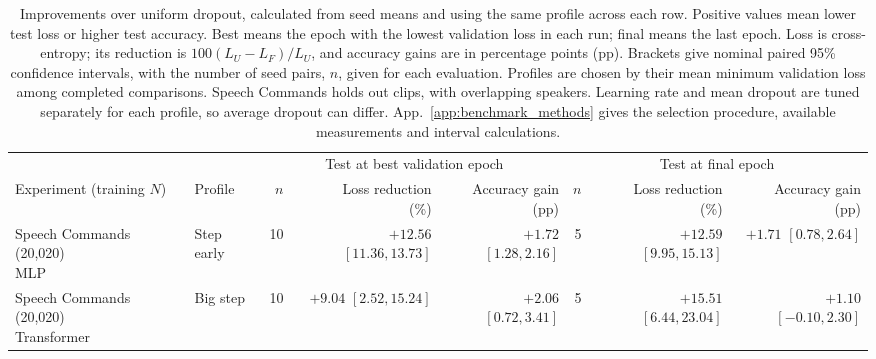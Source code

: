 \begin{table}[t]
\centering
\caption{Improvements over uniform dropout, calculated from seed means and using the same profile across each row. Positive values mean lower test loss or higher test accuracy. Best means the epoch with the lowest validation loss in each run; final means the last epoch. Loss is cross-entropy; its reduction is $100(L_U-L_F)/L_U$, and accuracy gains are in percentage points (pp). Brackets give nominal paired 95\% confidence intervals, with the number of seed pairs, $n$, given for each evaluation. Profiles are chosen by their mean minimum validation loss among completed comparisons. Speech Commands holds out clips, with overlapping speakers. Learning rate and mean dropout are tuned separately for each profile, so average dropout can differ. App.~\ref{app:benchmark_methods} gives the selection procedure, available measurements and interval calculations.}
\label{tab:frontloaded_results}
\footnotesize
\setlength{\tabcolsep}{4pt}
\renewcommand{\arraystretch}{1.15}
\begin{tabular}{@{}llrrrrrr@{}}
\toprule
& & \multicolumn{3}{c}{Test at best validation epoch} & \multicolumn{3}{c}{Test at final epoch} \\
\cmidrule(lr){3-5}\cmidrule(l){6-8}
Experiment (training $N$) & Profile & $n$ & \shortstack{Loss reduction\\(\%)} & \shortstack{Accuracy gain\\(pp)} & $n$ & \shortstack{Loss reduction\\(\%)} & \shortstack{Accuracy gain\\(pp)} \\
\midrule
\shortstack[l]{Speech Commands (20,020)\\MLP} & Step early & 10 & \shortstack{$+12.56$\\[-1pt]{\scriptsize $[11.36, 13.73]$}} & \shortstack{$+1.72$\\[-1pt]{\scriptsize $[1.28, 2.16]$}} & 5 & \shortstack{$+12.59$\\[-1pt]{\scriptsize $[9.95, 15.13]$}} & \shortstack{$+1.71$\\[-1pt]{\scriptsize $[0.78, 2.64]$}} \\
\shortstack[l]{Speech Commands (20,020)\\Transformer} & Big step & 10 & \shortstack{$+9.04$\\[-1pt]{\scriptsize $[2.52, 15.24]$}} & \shortstack{$+2.06$\\[-1pt]{\scriptsize $[0.72, 3.41]$}} & 5 & \shortstack{$+15.51$\\[-1pt]{\scriptsize $[6.44, 23.04]$}} & \shortstack{$+1.10$\\[-1pt]{\scriptsize $[-0.10, 2.30]$}} \\

\end{tabular}
\end{table}
